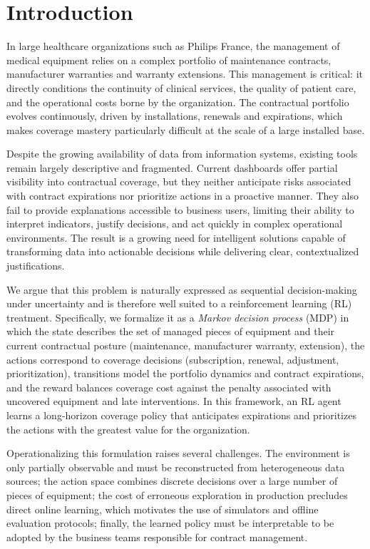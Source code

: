 \section{Introduction}
\label{sec:introduction}

In large healthcare organizations such as Philips France, the management of
medical equipment relies on a complex portfolio of maintenance contracts,
manufacturer warranties and warranty extensions. This management is critical:
it directly conditions the continuity of clinical services, the quality of
patient care, and the operational costs borne by the organization. The
contractual portfolio evolves continuously, driven by installations, renewals
and expirations, which makes coverage mastery particularly difficult at the
scale of a large installed base.

Despite the growing availability of data from information systems, existing
tools remain largely descriptive and fragmented. Current dashboards offer
partial visibility into contractual coverage, but they neither anticipate
risks associated with contract expirations nor prioritize actions in a
proactive manner. They also fail to provide explanations accessible to
business users, limiting their ability to interpret indicators, justify
decisions, and act quickly in complex operational environments. The result
is a growing need for intelligent solutions capable of transforming data into
actionable decisions while delivering clear, contextualized justifications.

We argue that this problem is naturally expressed as sequential
decision-making under uncertainty and is therefore well suited to a
reinforcement learning (RL) treatment. Specifically, we formalize it as a
\emph{Markov decision process} (MDP) in which the state describes the set of
managed pieces of equipment and their current contractual posture
(maintenance, manufacturer warranty, extension), the actions correspond to
coverage decisions (subscription, renewal, adjustment, prioritization),
transitions model the portfolio dynamics and contract expirations, and the
reward balances coverage cost against the penalty associated with uncovered
equipment and late interventions. In this framework, an RL agent learns a
long-horizon coverage policy that anticipates expirations and prioritizes
the actions with the greatest value for the organization.

Operationalizing this formulation raises several challenges. The environment
is only partially observable and must be reconstructed from heterogeneous
data sources; the action space combines discrete decisions over a large
number of pieces of equipment; the cost of erroneous exploration in
production precludes direct online learning, which motivates the use of
simulators and offline evaluation protocols; finally, the learned policy
must be interpretable to be adopted by the business teams responsible for
contract management.

